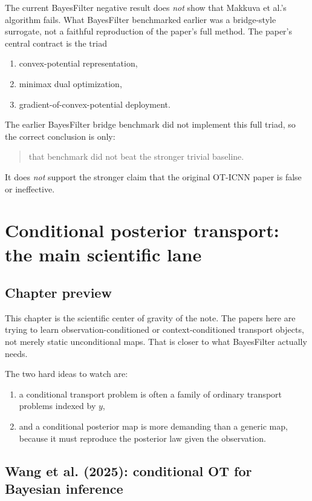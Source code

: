 \documentclass[11pt]{report}
\begin{document}
The current BayesFilter negative result does \emph{not} show that Makkuva et al.'s
algorithm fails.  What BayesFilter benchmarked earlier was a bridge-style surrogate,
not a faithful reproduction of the paper's full method.  The paper's central
contract is the triad
\begin{enumerate}[label=(\roman*)]
  \item convex-potential representation,
  \item minimax dual optimization,
  \item gradient-of-convex-potential deployment.
\end{enumerate}
The earlier BayesFilter bridge benchmark did not implement this full triad, so the
correct conclusion is only:
\begin{quote}
that benchmark did not beat the stronger trivial baseline.
\end{quote}
It does \emph{not} support the stronger claim that the original OT-ICNN paper is
false or ineffective.

\chapter{Conditional posterior transport: the main scientific lane}

\section{Chapter preview}

This chapter is the scientific center of gravity of the note.  The papers here are
trying to learn observation-conditioned or context-conditioned transport objects,
not merely static unconditional maps.  That is closer to what BayesFilter actually
needs.

The two hard ideas to watch are:
\begin{enumerate}[label=(\roman*)]
  \item a conditional transport problem is often a family of ordinary transport
  problems indexed by $y$,
  \item and a conditional posterior map is more demanding than a generic map,
  because it must reproduce the posterior law given the observation.
\end{enumerate}

\section{Wang et al. (2025): conditional OT for Bayesian inference}
\end{document}
